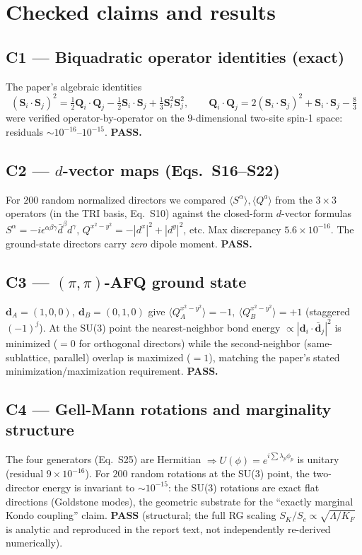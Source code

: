 \documentclass[11pt]{article}
\begin{document}
\section{Checked claims and results}

\subsection*{C1 --- Biquadratic operator identities (exact)}
The paper's algebraic identities
\[(\mathbf S_i\!\cdot\!\mathbf S_j)^2=\tfrac12\mathbf Q_i\!\cdot\!\mathbf Q_j
-\tfrac12\mathbf S_i\!\cdot\!\mathbf S_j+\tfrac13\mathbf S_i^2\mathbf S_j^2,\qquad
\mathbf Q_i\!\cdot\!\mathbf Q_j = 2(\mathbf S_i\!\cdot\!\mathbf S_j)^2
+\mathbf S_i\!\cdot\!\mathbf S_j-\tfrac83\]
were verified operator-by-operator on the $9$-dimensional two-site spin-1 space:
residuals $\sim10^{-16}$--$10^{-15}$. \textbf{PASS.}

\subsection*{C2 --- $d$-vector maps (Eqs.~S16--S22)}
For $200$ random normalized directors we compared $\langle S^\alpha\rangle,
\langle Q^a\rangle$ from the $3\times3$ operators (in the TRI basis, Eq.~S10) against
the closed-form $d$-vector formulas $S^\alpha=-i\epsilon^{\alpha\beta\gamma}
\bar d^\beta d^\gamma$, $Q^{x^2-y^2}=-|d^x|^2+|d^y|^2$, etc. Max discrepancy
$5.6\times10^{-16}$. The ground-state directors carry \emph{zero} dipole moment.
\textbf{PASS.}

\subsection*{C3 --- $(\pi,\pi)$-AFQ ground state}
$\mathbf d_A=(1,0,0),\ \mathbf d_B=(0,1,0)$ give
$\langle Q_A^{x^2-y^2}\rangle=-1,\ \langle Q_B^{x^2-y^2}\rangle=+1$ (staggered
$(-1)^j$). At the SU(3) point the nearest-neighbor bond energy
$\propto|\mathbf d_i\!\cdot\!\bar{\mathbf d}_j|^2$ is minimized ($=0$ for orthogonal
directors) while the second-neighbor (same-sublattice, parallel) overlap is maximized
($=1$), matching the paper's stated minimization/maximization requirement.
\textbf{PASS.}

\subsection*{C4 --- Gell-Mann rotations and marginality structure}
The four generators (Eq.~S25) are Hermitian $\Rightarrow U(\phi)=e^{i\sum\lambda_p\phi_p}$
is unitary (residual $9\times10^{-16}$). For $200$ random rotations at the SU(3) point,
the two-director energy is invariant to $\sim10^{-15}$: the SU(3) rotations are exact flat
directions (Goldstone modes), the geometric substrate for the ``exactly marginal Kondo
coupling'' claim. \textbf{PASS} (structural; the full RG scaling
$S_K/S_c\propto\sqrt{\Lambda/K_F}$ is analytic and reproduced in the report text, not
independently re-derived numerically).
\end{document}
